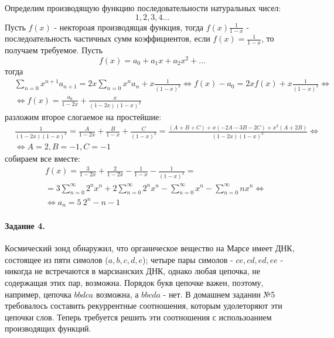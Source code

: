 \documentclass[a4paper,12pt]{article}
\begin{document}
\begin{Solution}
Определим производящую функцию последовательности натуральных чисел:
\[
	1, 2, 3, 4 ...
\]
Пусть $f\left(x\right)$ - нектороая производящая функция, тогда $f\left(x\right) \frac{1}{1-x}$ - последоательность частичных сумм коэффициентов, если $f\left(x\right) = \frac{1}{1-x}$, то получаем требуемое.
Пусть
\[
	f\left(x\right) = a_0 + a_1 x + a_2 x^2 + ...
\]
тогда
\[
	\begin{split}
		& \sum_{n=0}x^{n+1} a_{n+1} = 2 x\sum_{n=0}x^n a_n + x\frac{1}{{\left(1-x\right)}^2} \Leftrightarrow f\left(x\right) - a_0 = 2x f\left(x\right) + x\frac{1}{{\left(1-x\right)}^2} \Leftrightarrow \\
		& \Leftrightarrow f\left(x\right) = \frac{a_0}{1-2x} + \frac{x}{{\left(1-2x\right)\left(1-x\right)}^2}
	\end{split}
\]
разложим второе слогаемое на простейшие:
\[
	\begin{split}
		& \frac{1}{\left(1-2x\right){\left(1-x\right)}^2} = \frac{A}{1-2x} + \frac{B}{1-x} + \frac{C}{{\left(1-x\right)}^2} = \frac{\left(A+B+C\right) + x\left(-2A-3B-2C\right) + x^2 \left(A + 2B\right)}{\left(1-2x\right){\left(1-x\right)}^2} \Leftrightarrow \\
		& \Leftrightarrow A = 2, B = -1, C = -1
	\end{split}
\]
собираем все вместе:
\[
	\begin{split}
		& f \left(x\right) = \frac{3}{1-2x} + \frac{2}{1-2x} - \frac{1}{1-x} - \frac{1}{{\left(1-x\right)}^2} = \\
		& = 3\sum_{n=0}^{\infty} 2^n x^n + 2\sum_{n=0}^{\infty} 2^n x^n - \sum_{n=0}^{\infty} x^n - \sum_{n=0}^{\infty} n x^n \Leftrightarrow \\
		& \Leftrightarrow a_n = 5 ~ 2^n - n - 1
	\end{split}
\]
\end{Solution}

\paragraph{Задание 4.} Космический зонд обнаружил, что органическое вещество на Марсе имеет ДНК, состоящее из пяти симолов ($a,b,c,d,e$); четыре пары симолов - $ce, cd, ed, ee$ - никогда не встречаются в марсианских ДНК, однако любая цепочка, не содержащая этих пар, возможна. Порядок букв  цепочке важен, поэтому, например, цепочка $bbdca$ возможна, а $bbcda$ - нет. В домашнем задании №5 требовалось составить рекуррентные соотношения, которым удолеторяют эти цепочки слов. Теперь требуется решить эти соотношения с использоанием производящих функций.
\end{document}
